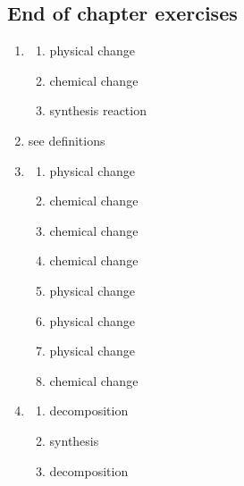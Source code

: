 \subsection{End of chapter exercises}
\begin{multicols}{3}
 \begin{enumerate}[noitemsep, label=\textbf{(\arabic*)} ]
  \item 
 \begin{enumerate}[noitemsep, label=\textbf{(\alph*)} ]
\item physical change
\item chemical change
\item synthesis reaction
\end{enumerate}
\item see definitions
\item 
 \begin{enumerate}[noitemsep, label=\textbf{(\alph*)} ]
\item physical change
\item chemical change
\item chemical change
\item chemical change
\item physical change
\item physical change
\item physical change
\item chemical change
\end{enumerate}
\item
 \begin{enumerate}[noitemsep, label=\textbf{(\alph*)} ]
\item decomposition
\item synthesis
\item decomposition
\end{enumerate}
 \end{enumerate}
\end{multicols}

